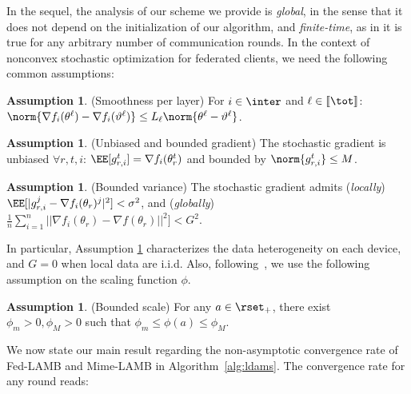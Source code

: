 \documentclass[nohyperref]{article}
\theoremstyle{plain}
\theoremstyle{definition}
\newtheorem{assumption}[theo]{Assumption}
\theoremstyle{remark}
\begin{document}
In the sequel, the analysis of our scheme we provide is \emph{global}, in the sense that it does not depend on the initialization of our algorithm, and \emph{finite-time}, as in it is true for any arbitrary number of communication rounds. In the  context of nonconvex stochastic optimization for federated clients, we need the following common assumptions:
\begin{assumption}\label{ass:smooth}(Smoothness per layer)
For $i \in \inter$ and $\ell \in \llbracket \tot \rrbracket$: $\norm{\nabla f_i (\theta^\ell) - \nabla f_i (\vartheta^\ell)} \leq L_\ell \norm{\theta^\ell-\vartheta^\ell}$.
\end{assumption}
\begin{assumption}\label{ass:boundgrad}(Unbiased and bounded gradient)
The stochastic gradient is unbiased $\forall r,t,i$: $\EE[g_{r,i}^t] = \nabla f_i(\theta_r^t)$ and bounded by $\norm{g_{r,i}^t} \leq M$.
\end{assumption}
\begin{assumption}\label{ass:var}(Bounded variance)
The stochastic gradient admits (\emph{locally}) $\EE[|g_{r,i}^j - \nabla f_i(\theta_r)^j|^2] < \sigma^2$, and (\emph{globally}) $ \frac{1}{n} \sum_{i=1}^n ||\nabla f_{i}(\theta_r) - \nabla f(\theta_r)||^2] < G^2$.
\end{assumption}
In particular, Assumption \ref{ass:var} characterizes the data heterogeneity on each device, and $G = 0$ when local data are i.i.d. Also, following~\citet{you2019large}, we use the following assumption on the scaling function $\phi$.
\begin{assumption}\label{ass:phi}(Bounded scale)
For any $a \in \rset_+$, there exist $\phi_m>0,\phi_M>0$ such that $\phi_m \leq  \phi(a) \leq \phi_M$.
\end{assumption}
We now state our main result regarding the non-asymptotic convergence rate of Fed-LAMB and Mime-LAMB in Algorithm~\ref{alg:ldams}. 
The convergence rate for any round reads: \vspace{0.1in}
\end{document}
